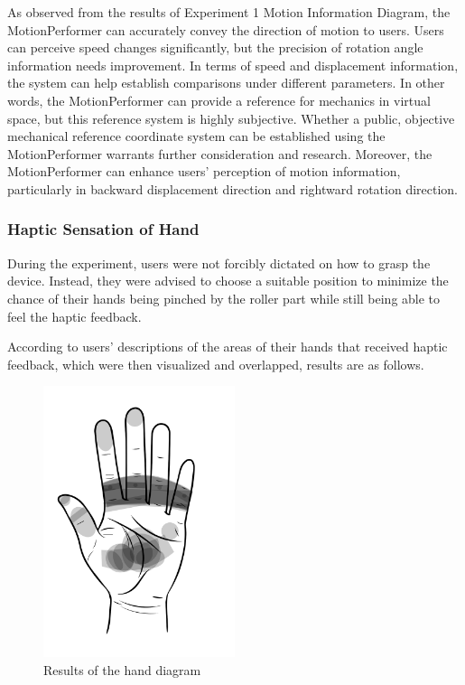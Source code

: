 As observed from the results of Experiment 1 Motion Information Diagram, the MotionPerformer can accurately convey the direction of motion to users. Users can perceive speed changes significantly, but the precision of rotation angle information needs improvement. In terms of speed and displacement information, the system can help establish comparisons under different parameters. In other words, the MotionPerformer can provide a reference for mechanics in virtual space, but this reference system is highly subjective. Whether a public, objective mechanical reference coordinate system can be established using the MotionPerformer warrants further consideration and research. Moreover, the MotionPerformer can enhance users' perception of motion information, particularly in backward displacement direction and rightward rotation direction.

\subsubsection{Haptic Sensation of Hand}
During the experiment, users were not forcibly dictated on how to grasp the device. Instead, they were advised to choose a suitable position to minimize the chance of their hands being pinched by the roller part while still being able to feel the haptic feedback.

According to users' descriptions of the areas of their hands that received haptic feedback, which were then visualized and overlapped, results are as follows.

\begin{figure}[h]
\centering
\includegraphics[width=0.5\textwidth]{A_thesis/figures/016.png}
\caption{Results of the hand diagram}
\end{figure}

